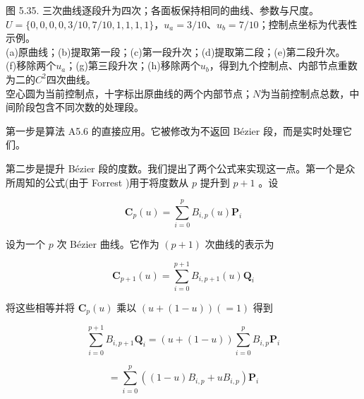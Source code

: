 \documentclass[../main.tex]{subfiles}
\begin{document}
\begin{center}
\begin{minipage}{30.2cm}
\vspace*{.6\baselineskip}
\centering
{}
\par\medskip
{}
\par\medskip
{}
\par\medskip
{}
\par\smallskip
图 5.35. 三次曲线逐段升为四次；各面板保持相同的曲线、参数与尺度。\\
$U=\{0,0,0,0,3/10,7/10,1,1,1,1\}$，$u_a=3/10$、$u_b=7/10$；控制点坐标为代表性示例。\\
(a)原曲线；(b)提取第一段；(c)第一段升次；(d)提取第二段；(e)第二段升次。\\
(f)移除两个$u_a$；(g)第三段升次；(h)移除两个$u_b$，得到九个控制点、内部节点重数为二的$C^2$四次曲线。\\
空心圆为当前控制点，十字标出原曲线的两个内部节点；$N$为当前控制点总数，中间阶段包含不同次数的处理段。
\end{minipage}
\end{center}

第一步是算法 A5.6 的直接应用。它被修改为不返回 Bézier 段，而是实时处理它们。

第二步是提升 Bézier 段的度数。我们提出了两个公式来实现这一点。第一个是众所周知的公式(由于 Forrest \cite{Forr72})用于将度数从 \(p\) 提升到 \(p + 1\) 。设

\[
{\mathbf{C}}_{p}\left( u\right)  = \mathop{\sum }\limits_{{i = 0}}^{p}{B}_{i,p}\left( u\right) {\mathbf{P}}_{i}
\]



设为一个 \(p\) 次 Bézier 曲线。它作为 \(\left( {p + 1}\right)\) 次曲线的表示为

\[
{\mathbf{C}}_{p + 1}\left( u\right)  = \mathop{\sum }\limits_{{i = 0}}^{{p + 1}}{B}_{i,p + 1}\left( u\right) {\mathbf{Q}}_{i} \tag{5.34}
\]

将这些相等并将 \({\mathbf{C}}_{p}\left( u\right)\) 乘以 \(\left( {u + \left( {1 - u}\right) }\right) \left( { = 1}\right)\) 得到

\[
\mathop{\sum }\limits_{{i = 0}}^{{p + 1}}{B}_{i,p + 1}{\mathbf{Q}}_{i} = \left( {u + \left( {1 - u}\right) }\right) \mathop{\sum }\limits_{{i = 0}}^{p}{B}_{i,p}{\mathbf{P}}_{i}
\]

\[
= \mathop{\sum }\limits_{{i = 0}}^{p}\left( {\left( {1 - u}\right) {B}_{i,p} + u{B}_{i,p}}\right) {\mathbf{P}}_{i}
\]
\end{document}
